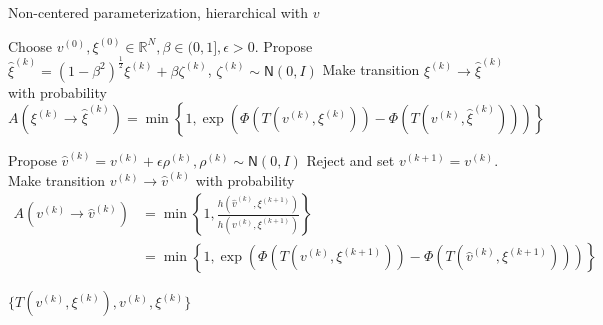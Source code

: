 \documentclass{siamart1116}
\begin{document}
\begin{algorithm}

\caption{Non-centered parameterization, hierarchical with $v$}
\label{alg:hier_v}
\begin{algorithmic}
\State Choose $v^{(0)}, \xi^{(0)} \in \mathbb{R}^N, \beta \in (0, 1], \epsilon > 0$.
\State Propose $\hat\xi^{(k)} = (1-\beta^2)^{\frac{1}{2}}\xi^{(k)} + \beta \zeta^{(k)}$, $\zeta^{(k)} \sim \mathsf{N}(0, I)$
\State Make transition $\xi^{(k)} \to \hat\xi^{(k)}$ with probability
\[ A(\xi^{(k)} \to \hat\xi^{(k)}) = \min\left\{1, \exp\left(\Phi(T(v^{(k)}, \xi^{(k)})) - \Phi(T(v^{(k)}, \hat \xi^{(k)}))\right) \right\}\]

\State Propose $\hat v^{(k)} = v^{(k)} + \epsilon \rho^{(k)}, \rho^{(k)} \sim \mathsf{N}(0,I)$
    \State Reject and set $v^{(k+1)} = v^{(k)}$.
\Else
\State Make transition $v^{(k)} \to \hat v^{(k)}$ with probability
\begin{align*}
 A(v^{(k)} \to \hat v^{(k)}) &= \min\left\{1, \frac{h(\hat v^{(k)}, \xi^{(k+1)})}{h(v^{(k)}, \xi^{(k+1)})}\right\} \\
 &= \min\left\{1, \exp\left(\Phi(T(v^{(k)}, \xi^{(k+1)}))-\Phi(T(\hat v^{(k)}, \xi^{(k+1)})) \right) \right\}
 \end{align*}
\EndIf

\EndFor
\State \Return $\{ T(v^{(k)},\xi^{(k)}), v^{(k)}, \xi^{(k)} \}$
\end{algorithmic}
\end{algorithm}




\end{document}
